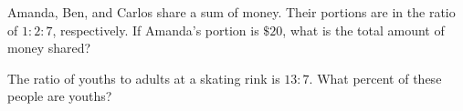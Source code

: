 %
%


Amanda, Ben, and Carlos share a sum of money. Their portions are in 
the ratio of $1:2:7$, respectively. If Amanda's portion is $\$20$, 
what is the total amount of money shared?


The ratio of youths to adults at a skating rink is $13:7$. 
What percent of these people are youths?

